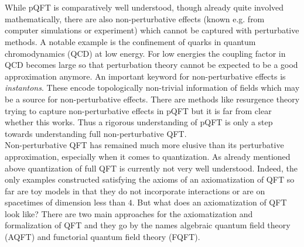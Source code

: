 \\\\
While pQFT is comparatively well understood, though already quite involved mathematically, there are also non-perturbative effects (known e.g. from computer simulations or experiment) which cannot be captured with perturbative methods. A notable example is the confinement of quarks in quantum chromodynamics (QCD) at low energy. For low energies the coupling factor in QCD becomes large so that perturbation theory cannot be expected to be a good approximation anymore. An important keyword for non-perturbative effects is \textit{instantons}. These encode topologically non-trivial information of fields which may be a source for non-perturbative effects. There are methods like resurgence theory trying to capture non-perturbative effects in pQFT but it is far from clear whether this works. Thus a rigorous understanding of pQFT is only a step towards understanding full non-perturbative QFT.
\\
Non-perturbative QFT has remained much more elusive than its perturbative approximation, especially when it comes to quantization. As already mentioned above quantization of full QFT is currently not very well understood. Indeed, the only examples constructed satisfying the axioms of an axiomatization of QFT so far are toy models in that they do not incorporate interactions or are on spacetimes of dimension less than $4$. But what does an axiomatization of QFT look like? There are two main approaches for the axiomatization and formalization of QFT and they go by the names algebraic quantum field theory (AQFT) and functorial quantum field theory (FQFT).
